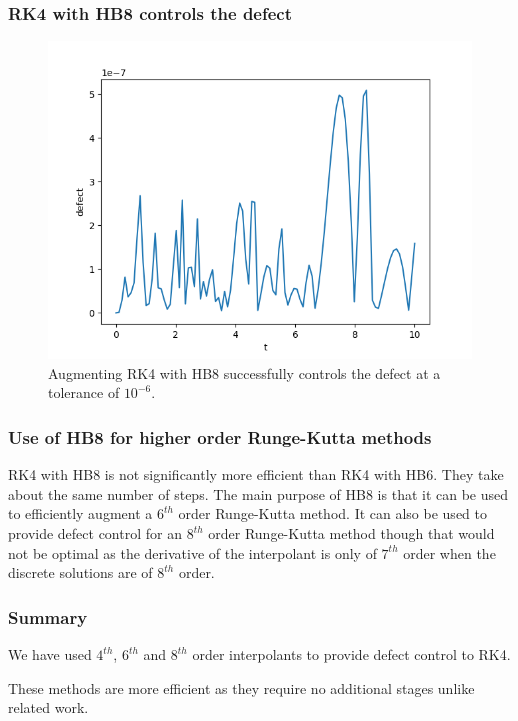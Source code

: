 \documentclass{beamer}
\begin{document}
\begin{frame}
\frametitle{RK4 with HB8 controls the defect}
\begin{figure}[H]
    \centering
    \includegraphics[width=0.7\linewidth]{./figures/rk4_with_hb8_p1_global_defect}
    \caption{Augmenting RK4 with HB8 successfully controls the defect at a tolerance of $10^{-6}$.}
    \label{fig:rk4_with_hb8_p1_global_defect}
\end{figure}
\end{frame}

\begin{frame}
\frametitle{Use of HB8 for higher order Runge-Kutta methods}
RK4 with HB8 is not significantly more efficient than RK4 with HB6. They take about the same number of steps. 
\newline \newline
The main purpose of HB8 is that it can be used to efficiently augment a $6^{th}$ order Runge-Kutta method.
\newline \newline
It can also be used to provide defect control for an $8^{th}$ order Runge-Kutta method though that would not be optimal as the derivative of the interpolant is only of $7^{th}$ order when the discrete solutions are of $8^{th}$ order. 
\end{frame}

\begin{frame}
\frametitle{Summary}

We have used $4^{th}$, $6^{th}$ and $8^{th}$ order interpolants to provide defect control to RK4.

These methods are more efficient as they require no additional stages unlike related work.

\end{frame}
\end{document}
